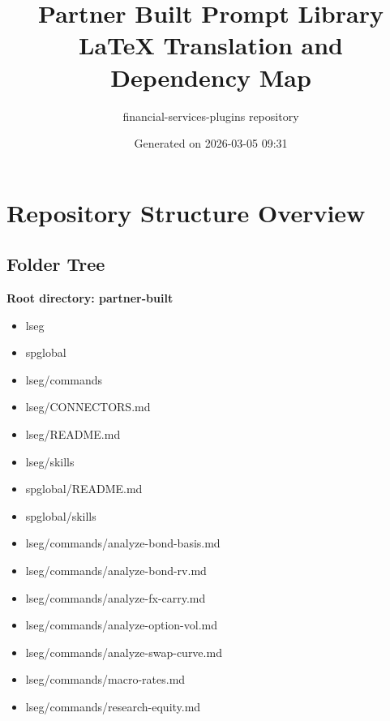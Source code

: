 \documentclass[11pt]{article}
\title{Partner Built Prompt Library\\LaTeX Translation and Dependency Map}
\author{financial-services-plugins repository}
\date{Generated on 2026-03-05 09:31 }
\begin{document}
\maketitle
\tableofcontents
\newpage

\section{Repository Structure Overview}

\subsection{Folder Tree}
\textbf{Root directory: partner-built}
\begin{itemize}[leftmargin=*,itemsep=1pt,topsep=2pt]
\item \hspace*{0.0em}lseg
\item \hspace*{0.0em}spglobal
\item \hspace*{0.9em}lseg/commands
\item \hspace*{0.9em}lseg/CONNECTORS.md
\item \hspace*{0.9em}lseg/README.md
\item \hspace*{0.9em}lseg/skills
\item \hspace*{0.9em}spglobal/README.md
\item \hspace*{0.9em}spglobal/skills
\item \hspace*{1.8em}lseg/commands/analyze-bond-basis.md
\item \hspace*{1.8em}lseg/commands/analyze-bond-rv.md
\item \hspace*{1.8em}lseg/commands/analyze-fx-carry.md
\item \hspace*{1.8em}lseg/commands/analyze-option-vol.md
\item \hspace*{1.8em}lseg/commands/analyze-swap-curve.md
\item \hspace*{1.8em}lseg/commands/macro-rates.md
\item \hspace*{1.8em}lseg/commands/research-equity.md

\end{itemize}
\end{document}
